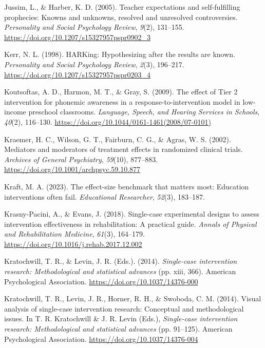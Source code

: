 \documentclass{krantz}
\newlength{\cslhangindent}
\newlength{\cslentryspacingunit} %
\newenvironment{CSLReferences}[2] %
{%
\setlength{\parindent}{0pt}
\ifodd #1
\let\oldpar\par
\def\par{\hangindent=\cslhangindent\oldpar}
\fi
\setlength{\parskip}{#2\cslentryspacingunit}
}%
{}
\begin{document}
\begin{CSLReferences}{1}{0}
\leavevmode{}%
Jussim, L., \& Harber, K. D. (2005). Teacher expectations and self-fulfilling prophecies: Knowns and unknowns, resolved and unresolved controversies. \emph{Personality and Social Psychology Review}, \emph{9}(2), 131--155. \url{https://doi.org/10.1207/s15327957pspr0902_3}

\leavevmode{}%
Kerr, N. L. (1998). {HARKing}: Hypothesizing after the results are known. \emph{Personality and Social Psychology Review}, \emph{2}(3), 196--217. \url{https://doi.org/10.1207/s15327957pspr0203_4}

\leavevmode{}%
Koutsoftas, A. D., Harmon, M. T., \& Gray, S. (2009). The effect of {Tier} 2 intervention for phonemic awareness in a response-to-intervention model in low-income preschool classrooms. \emph{Language, Speech, and Hearing Services in Schools}, \emph{40}(2), 116--130. \url{https://doi.org/10.1044/0161-1461(2008/07-0101)}

\leavevmode{}%
Kraemer, H. C., Wilson, G. T., Fairburn, C. G., \& Agras, W. S. (2002). Mediators and moderators of treatment effects in randomized clinical trials. \emph{Archives of General Psychiatry}, \emph{59}(10), 877--883. \url{https://doi.org/10.1001/archpsyc.59.10.877}

\leavevmode{}%
Kraft, M. A. (2023). The effect-size benchmark that matters most: Education interventions often fail. \emph{Educational Researcher}, \emph{52}(3), 183--187.

\leavevmode{}%
Krasny-Pacini, A., \& Evans, J. (2018). Single-case experimental designs to assess intervention effectiveness in rehabilitation: {A} practical guide. \emph{Annals of Physical and Rehabilitation Medicine}, \emph{61}(3), 164--179. \url{https://doi.org/10.1016/j.rehab.2017.12.002}

\leavevmode{}%
Kratochwill, T. R., \& Levin, J. R. (Eds.). (2014). \emph{Single-case intervention research: {Methodological} and statistical advances} (pp. xiii, 366). {American Psychological Association}. \url{https://doi.org/10.1037/14376-000}

\leavevmode{}%
Kratochwill, T. R., Levin, J. R., Horner, R. H., \& Swoboda, C. M. (2014). Visual analysis of single-case intervention research: {Conceptual} and methodological issues. In T. R. Kratochwill \& J. R. Levin (Eds.), \emph{Single-case intervention research: {Methodological} and statistical advances} (pp. 91--125). {American Psychological Association}. \url{https://doi.org/10.1037/14376-004}


\end{CSLReferences}
\end{document}
